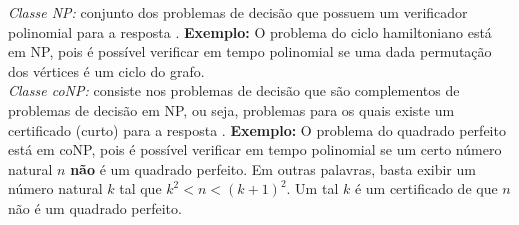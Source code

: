 \textit{Classe NP:} conjunto dos problemas de decisão que possuem um verificador polinomial para a resposta . \textbf{Exemplo:} O problema do ciclo hamiltoniano está em NP, pois é possível verificar em tempo polinomial se uma dada permutação dos vértices é um ciclo do grafo.\\

\textit{Classe coNP:} consiste nos problemas de decisão que são complementos de problemas de decisão em NP, ou seja, problemas para os quais existe um certificado (curto) para a resposta . \textbf{Exemplo:} O problema do quadrado perfeito está em coNP,  pois é possível verificar em tempo polinomial se um certo número natural $n$ \textbf{não} é um quadrado perfeito. Em outras palavras, basta exibir um número natural $k$ tal que $k^2 < n < (k+1)^2$.  Um tal $k$ é um certificado de que $n$ não é um quadrado perfeito.\\[6pt]
